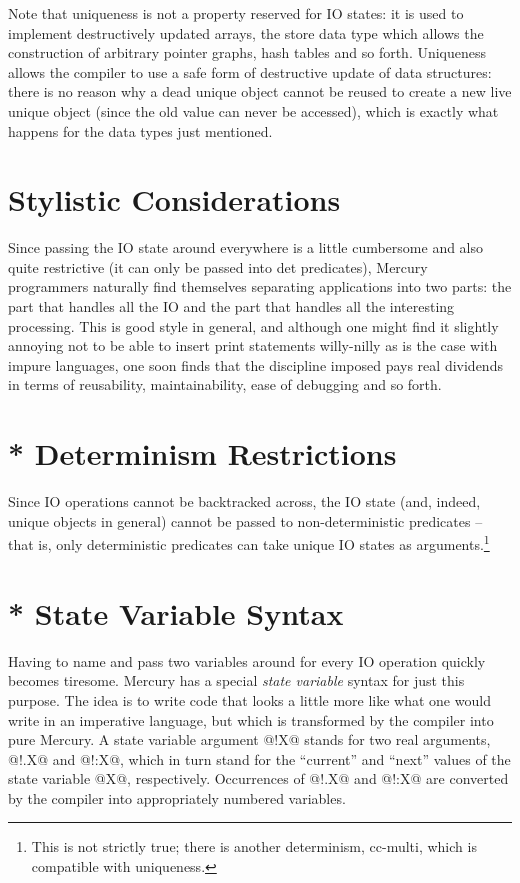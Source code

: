Note that uniqueness is not a property reserved for IO states:
it is used to implement destructively updated arrays, the
store data type which allows the construction of arbitrary
pointer graphs, hash tables and so forth.  Uniqueness allows
the compiler to use a safe form of destructive update of data
structures: there is no reason why a dead unique object cannot
be reused to create a new live unique object (since the old
value can never be accessed), which is exactly what happens
for the data types just mentioned.

\section{Stylistic Considerations}

Since passing the IO state around everywhere is a little
cumbersome and also quite restrictive (it can only be passed
into det predicates), Mercury programmers naturally find
themselves separating applications into two parts: the part
that handles all the IO and the part that handles all the
interesting processing.  This is good style in general, and
although one might find it slightly annoying not to be able to
insert print statements willy-nilly as is the case with impure
languages, one soon finds that the discipline imposed pays
real dividends in terms of reusability, maintainability, ease
of debugging and so forth.

\section{* Determinism Restrictions}

Since IO operations cannot be backtracked across, the IO state
(and, indeed, unique objects in general) cannot be passed to
non-deterministic predicates -- that is, only deterministic
predicates can take unique IO states as arguments.\footnote{This is not strictly true; there is another
determinism, cc-multi, which is compatible with uniqueness.}

\section{* State Variable Syntax}

Having to name and pass two variables around for every IO
operation quickly becomes tiresome.  Mercury has a special
\emph{state variable} syntax for just this purpose.  The idea is to
write code that looks a little more like what one would write
in an imperative language, but which is transformed by the
compiler into pure Mercury.  A state variable argument @!X@
stands for two real arguments, @!.X@ and @!:X@, which in turn
stand for the ``current'' and ``next'' values of the state variable
@X@, respectively.  Occurrences of @!.X@ and @!:X@ are converted by
the compiler into appropriately numbered variables.

